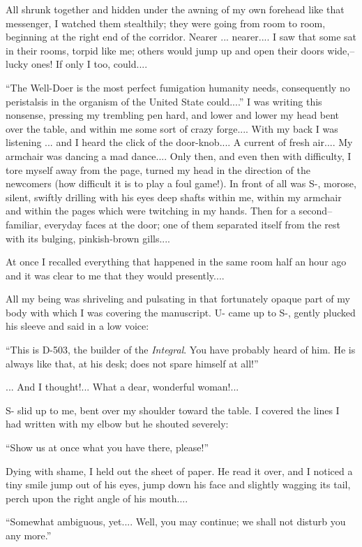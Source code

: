 \documentclass[11pt,openany]{book}
\begin{document}
All shrunk together and hidden under the awning of my own forehead like that messenger, I watched them stealthily; they were going from room to room, beginning at the right end of the corridor. Nearer ... nearer.... I saw that some sat in their rooms, torpid like me; others would jump up and open their doors wide,--lucky ones! If only I too, could....

``The Well-Doer is the most perfect fumigation humanity needs, consequently no peristalsis in the organism of the United State could....'' I was writing this nonsense, pressing my trembling pen hard, and lower and lower my head bent over the table, and within me some sort of crazy forge.... With my back I was listening ... and I heard the click of the door-knob.... A current of fresh air.... My armchair was dancing a mad dance.... Only then, and even then with difficulty, I tore myself away from the page, turned my head in the direction of the newcomers (how difficult it is to play a foul game!). In front of all was S-, morose, silent, swiftly drilling with his eyes deep shafts within me, within my armchair and within the pages which were twitching in my hands. Then for a second--familiar, everyday faces at the door; one of them separated itself from the rest with its bulging, pinkish-brown gills....

At once I recalled everything that happened in the same room half an hour ago and it was clear to me that they would presently....

All my being was shriveling and pulsating in that fortunately opaque part of my body with which I was covering the manuscript. U- came up to S-, gently plucked his sleeve and said in a low voice:

``This is D-503, the builder of the \emph{Integral}. You have probably heard of him. He is always like that, at his desk; does not spare himself at all!''

... And I thought!... What a dear, wonderful woman!...

S- slid up to me, bent over my shoulder toward the table. I covered the lines I had written with my elbow but he shouted severely:

``Show us at once what you have there, please!''

Dying with shame, I held out the sheet of paper. He read it over, and I noticed a tiny smile jump out of his eyes, jump down his face and slightly wagging its tail, perch upon the right angle of his mouth....

``Somewhat ambiguous, yet.... Well, you may continue; we shall not disturb you any more.''
\end{document}
